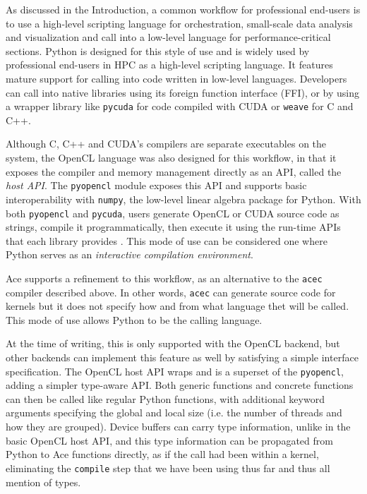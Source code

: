 \documentclass[9pt,preprint]{sigplanconf}
\begin{document}
As discussed in the Introduction, a common workflow for professional end-users is to use a high-level scripting language for orchestration, small-scale data analysis and visualization and call into a low-level language for performance-critical sections. Python is designed for this style of use \cite{sanner1999python} and is widely used by professional end-users in HPC as a high-level scripting language. It features mature support for calling into code written in low-level languages. Developers can call into native libraries using its foreign function interface (FFI),  or by using a wrapper library like \verb|pycuda| for code compiled with CUDA \cite{klockner2011pycuda} or \verb|weave| for C and C++. 

Although C, C++ and CUDA's compilers are separate executables on the system, the OpenCL language was also designed for this workflow, in that it exposes the compiler and memory management directly as an API, called the \emph{host API}. The \verb|pyopencl| module exposes this API and supports basic interoperability with \verb|numpy|, the low-level linear algebra package for Python. With both \verb|pyopencl| and \verb|pycuda|, users generate OpenCL or CUDA source code as strings, compile it programmatically, then execute it using the run-time APIs that each library provides \cite{klockner2011pycuda}. This mode of use can be considered one where Python serves as an \emph{interactive compilation environment}.

Ace supports a refinement to this workflow, as an alternative to the \verb|acec| compiler described above. In other words, \verb|acec| can generate source code for kernels but it does not specify how and from what language thet will be called. This mode of use allows Python to be the calling language.

At the time of writing, this is only supported with the OpenCL backend, but other backends can implement this feature as well by satisfying a simple interface specification. The OpenCL host API wraps and is a superset of the \verb|pyopencl|, adding a simpler type-aware API. Both generic functions and concrete functions can then be called like regular Python functions, with additional keyword arguments specifying the global and local size (i.e. the number of threads and how they are grouped). Device buffers can carry type information, unlike in the basic OpenCL host API, and this type information can be propagated from Python to Ace functions directly, as if the call had been within a kernel,  eliminating the \verb|compile| step that we have been using thus far and thus all mention of types. 
\end{document}
